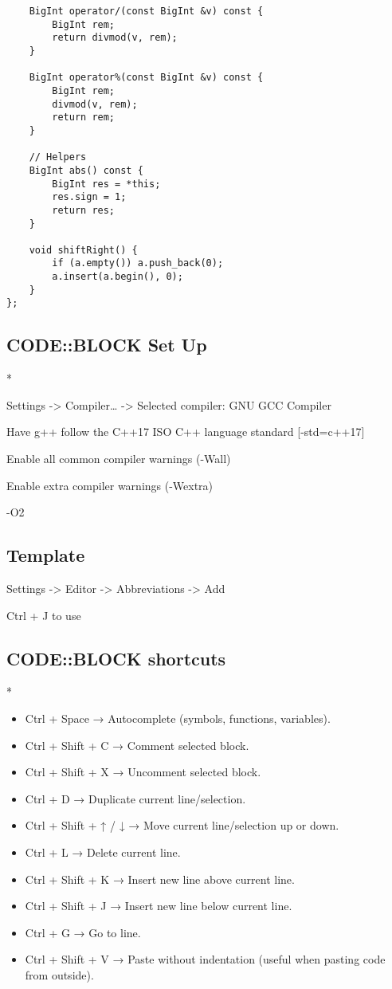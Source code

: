 \documentclass[11pt,a4paper]{article}
\begin{document}
\begin{multicols*}{2}
\begin{lstlisting}
    BigInt operator/(const BigInt &v) const {
        BigInt rem;
        return divmod(v, rem);
    }

    BigInt operator%(const BigInt &v) const {
        BigInt rem;
        divmod(v, rem);
        return rem;
    }

    // Helpers
    BigInt abs() const {
        BigInt res = *this;
        res.sign = 1;
        return res;
    }

    void shiftRight() {
        if (a.empty()) a.push_back(0);
        a.insert(a.begin(), 0);
    }
};

\end{lstlisting}

\subsection{CODE::BLOCK Set Up}
*

Settings -> Compiler… -> Selected compiler: GNU GCC Compiler

Have g++ follow the C++17 ISO C++ language standard [-std=c++17]

Enable all common compiler warnings (-Wall)

Enable extra compiler warnings (-Wextra)

-O2

\subsection{Template}

Settings -> Editor -> Abbreviations -> Add

Ctrl + J to use

\subsection{CODE::BLOCK shortcuts}
*

\begin{itemize}
    \item Ctrl + Space → Autocomplete (symbols, functions, variables).
    \item Ctrl + Shift + C → Comment selected block.
    \item Ctrl + Shift + X → Uncomment selected block.
    \item Ctrl + D → Duplicate current line/selection.
    \item Ctrl + Shift + ↑ / ↓ → Move current line/selection up or down.
    \item Ctrl + L → Delete current line.
    \item Ctrl + Shift + K → Insert new line above current line.
    \item Ctrl + Shift + J → Insert new line below current line.
    \item Ctrl + G → Go to line.
    \item Ctrl + Shift + V → Paste without indentation (useful when pasting code from outside).
\end{itemize}


\end{multicols*}
\end{document}
